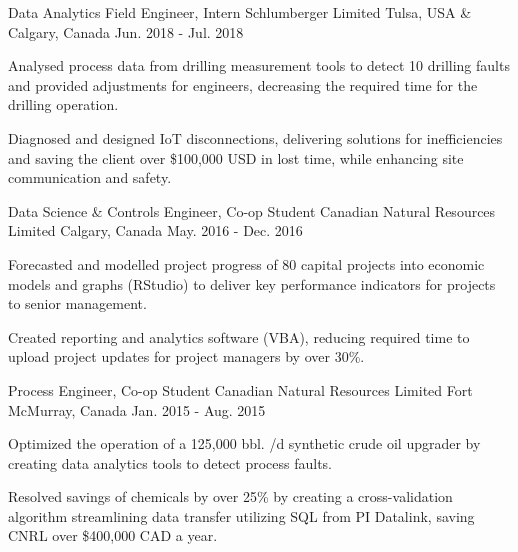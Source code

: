 \begin{cventries}
  \cventry
    {Data Analytics Field Engineer, Intern} %
    {Schlumberger Limited} %
    {Tulsa, USA \& Calgary, Canada} %
    {Jun. 2018 - Jul. 2018} %
    {
      \begin{cvitems} %
        \item {Analysed process data from drilling measurement tools to detect 10 drilling faults and provided adjustments for engineers, decreasing the required time for the drilling operation.}
        \item {Diagnosed and designed IoT disconnections, delivering solutions for inefficiencies and saving the client over \$100,000 USD in lost time, while enhancing site communication and safety.}
      \end{cvitems}
    }

  \cventry
    {Data Science \& Controls Engineer, Co-op Student} %
    {Canadian Natural Resources Limited} %
    {Calgary, Canada} %
    {May. 2016 - Dec. 2016} %
    {
      \begin{cvitems} %
        \item {Forecasted and modelled project progress of 80 capital projects into economic models and graphs (RStudio) to deliver key performance indicators for projects to senior management.}
        \item {Created reporting and analytics software (VBA), reducing required time to upload project updates for project managers by over 30\%.}
      \end{cvitems}
    }


  \cventry
    {Process Engineer, Co-op Student} %
    {Canadian Natural Resources Limited} %
    {Fort McMurray, Canada} %
    {Jan. 2015 - Aug. 2015} %
    {
      \begin{cvitems} %
        \item {Optimized the operation of a 125,000 bbl. /d synthetic crude oil upgrader by creating data analytics tools to detect process faults.}
        \item {Resolved savings of chemicals by over 25\% by creating a cross-validation algorithm streamlining data transfer utilizing SQL from PI Datalink, saving CNRL over \$400,000 CAD a year.}
      \end{cvitems}
    }

\end{cventries}
